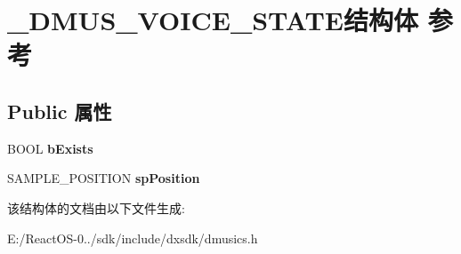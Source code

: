 \hypertarget{struct___d_m_u_s___v_o_i_c_e___s_t_a_t_e}{}\section{\+\_\+\+D\+M\+U\+S\+\_\+\+V\+O\+I\+C\+E\+\_\+\+S\+T\+A\+T\+E结构体 参考}
\label{struct___d_m_u_s___v_o_i_c_e___s_t_a_t_e}
\subsection*{Public 属性}
\begin{DoxyCompactItemize}
\item 
\mbox{\label{struct___d_m_u_s___v_o_i_c_e___s_t_a_t_e_ab28dda1f822edfc88d5a64e627d9e794}} 
B\+O\+OL {\bfseries b\+Exists}
\item 
\mbox{\label{struct___d_m_u_s___v_o_i_c_e___s_t_a_t_e_a7f7f1de4fe564aff9ce4b30d3ff29db8}} 
S\+A\+M\+P\+L\+E\+\_\+\+P\+O\+S\+I\+T\+I\+ON {\bfseries sp\+Position}
\end{DoxyCompactItemize}


该结构体的文档由以下文件生成\+:\begin{DoxyCompactItemize}
\item 
E\+:/\+React\+O\+S-\/0../sdk/include/dxsdk/dmusics.\+h\end{DoxyCompactItemize}
